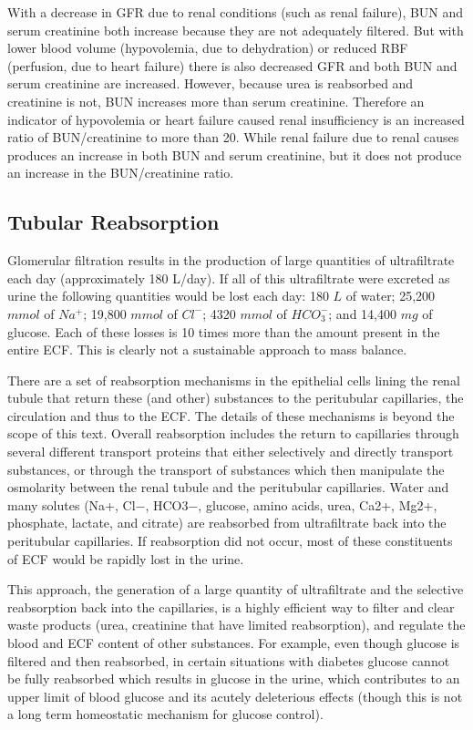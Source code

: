 With a decrease in GFR due to renal conditions (such as renal failure), BUN and serum creatinine both increase because they are not adequately filtered. But with lower blood volume (hypovolemia, due to dehydration) or reduced RBF (perfusion, due to heart failure) there is also decreased GFR and both BUN and serum creatinine are increased. However, because urea is reabsorbed and creatinine is not, BUN increases more than serum creatinine. Therefore an indicator of hypovolemia or heart failure caused renal insufficiency is an increased ratio of BUN/creatinine to more than 20. While renal failure due to renal causes produces an increase in both BUN and serum creatinine, but it does not produce an increase in the BUN/creatinine ratio.

\subsection{Tubular Reabsorption}

Glomerular filtration results in the production of large quantities of ultrafiltrate each day (approximately  180 L/day). If all of this ultrafiltrate were excreted as urine the following quantities would be lost each day: 180 $L$ of water; 25,200 $mmol$ of $Na^+$; 19,800 $mmol$ of $Cl^−$; 4320 $mmol$ of $HCO_3^−$; and 14,400 $mg$ of glucose. Each of these losses is 10 times more than the amount present in the entire ECF. This is clearly not a sustainable approach to mass balance. 

There are a set of reabsorption mechanisms in the epithelial cells lining the renal tubule that return these (and other) substances to the peritubular capillaries, the circulation and thus to the ECF. The details of these mechanisms is beyond the scope of this text. Overall reabsorption includes the return to capillaries through several different transport proteins that either selectively and directly transport substances, or through the transport of substances which then manipulate the osmolarity between the renal tubule and the peritubular capillaries.  Water and many solutes (Na+, Cl−, HCO3−, glucose, amino acids, urea, Ca2+, Mg2+, phosphate, lactate, and citrate) are reabsorbed from ultrafiltrate back into the peritubular capillaries. If reabsorption did not occur, most of these constituents of ECF would be rapidly lost in the urine.

This approach, the generation of a large quantity of ultrafiltrate and the selective reabsorption back into the capillaries, is a highly efficient way to filter and clear waste products (urea, creatinine that have limited reabsorption), and regulate the blood and ECF content of other substances. For example, even though glucose is filtered and then reabsorbed, in certain situations with diabetes glucose cannot be fully reabsorbed which results in glucose in the urine, which contributes to an upper limit of blood glucose and its acutely deleterious effects (though this is not a long term homeostatic mechanism for glucose control). 

